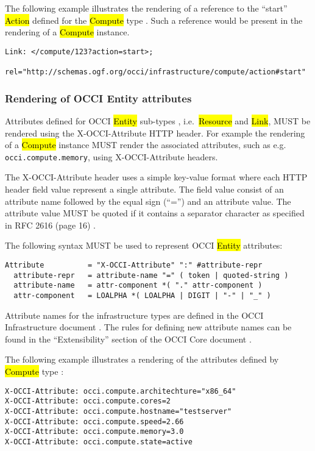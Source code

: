 \documentclass[10pt,a4paper]{article}
\begin{document}
The following example illustrates the rendering of a reference to the
``start'' \hl{Action} defined for the \hl{Compute} type
\cite{occi:infrastructure}. Such a reference would be present in the
rendering of a \hl{Compute} instance.

\begin{verbatim}
Link: </compute/123?action=start>;
    rel="http://schemas.ogf.org/occi/infrastructure/compute/action#start"
\end{verbatim}

\subsubsection{Rendering of OCCI Entity attributes}
Attributes defined for OCCI \hl{Entity} sub-types \cite{occi:core},
i.e.~\hl{Resource} and \hl{Link}, MUST be rendered using the
X-OCCI-Attribute HTTP header. For example the rendering of a
\hl{Compute} instance MUST render the associated attributes, such as
e.g. \texttt{occi.compute.memory}, using X-OCCI-Attribute headers.

The X-OCCI-Attribute header uses a simple key-value format where each
HTTP header field value represent a single attribute. The field value
consist of an attribute name followed by the equal sign (``='') and an
attribute value. The attribute value MUST be quoted if it contains a
separator character as specified in RFC 2616 (page 16) \cite{rfc2616}.

The following syntax MUST be used to represent OCCI \hl{Entity}
attributes:

\begin{verbatim}
Attribute          = "X-OCCI-Attribute" ":" #attribute-repr
  attribute-repr   = attribute-name "=" ( token | quoted-string )
  attribute-name   = attr-component *( "." attr-component )
  attr-component   = LOALPHA *( LOALPHA | DIGIT | "-" | "_" )
\end{verbatim}

Attribute names for the infrastructure types are defined in the OCCI
Infrastructure document \cite{occi:infrastructure}.  The rules for
defining new attribute names can be found in the ``Extensibility''
section of the OCCI Core document \cite{occi:core}.

The following example illustrates a rendering of the attributes
defined by \hl{Compute} type \cite{occi:infrastructure}:

\begin{verbatim}
X-OCCI-Attribute: occi.compute.architechture="x86_64"
X-OCCI-Attribute: occi.compute.cores=2
X-OCCI-Attribute: occi.compute.hostname="testserver"
X-OCCI-Attribute: occi.compute.speed=2.66
X-OCCI-Attribute: occi.compute.memory=3.0
X-OCCI-Attribute: occi.compute.state=active
\end{verbatim}
\end{document}
